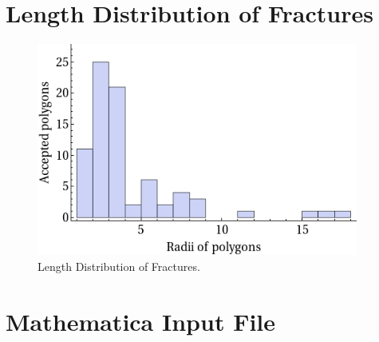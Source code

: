 \documentclass[a4paper,11pt]{article}
\begin{document}

\section{Length Distribution of Fractures}
\begin{figure}[H]
   \centering
    \includegraphics[width=300pt]{graphAcceptedDistribution.png}  \caption{Length Distribution of Fractures.}
\end{figure}


\newpage
\section{Mathematica Input File}

\end{document}
